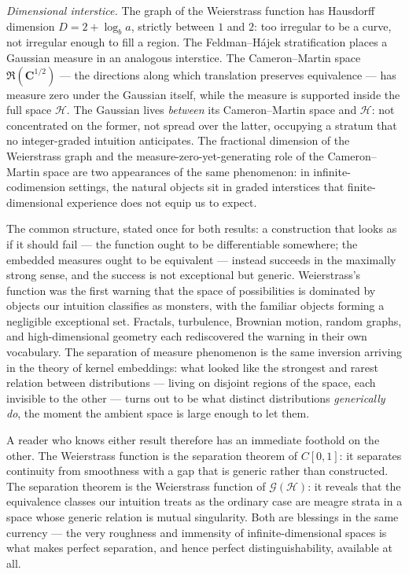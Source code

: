 \documentclass[12pt, oneside]{book}
\theoremstyle{plain}
\theoremstyle{definition}
\newcommand{\calH}{\mathcal{H}}
\newcommand{\ran}{\mathfrak{R}}
\newcommand{\calG}{\mathcal{G}}
\begin{document}
\emph{Dimensional interstice.} The graph of the Weierstrass function
has Hausdorff dimension $D = 2 + \log_b a$, strictly between $1$ and
$2$: too irregular to be a curve, not irregular enough to fill a
region. The Feldman--H\'ajek stratification places a Gaussian measure
in an analogous interstice. The Cameron--Martin space
$\ran(\mathbf{C}^{1/2})$ --- the directions along which translation preserves
equivalence --- has measure zero under the Gaussian itself, while the
measure is supported inside the full space $\calH$. The Gaussian lives
\emph{between} its Cameron--Martin space and $\calH$: not concentrated
on the former, not spread over the latter, occupying a stratum that no
integer-graded intuition anticipates. The fractional dimension of the
Weierstrass graph and the measure-zero-yet-generating role of the
Cameron--Martin space are two appearances of the same phenomenon: in
infinite-codimension settings, the natural objects sit in graded
interstices that finite-dimensional experience does not equip us to
expect.

The common structure, stated once for both results: a construction
that looks as if it should fail --- the function ought to be
differentiable somewhere; the embedded measures ought to be equivalent
--- instead succeeds in the maximally strong sense, and the success is
not exceptional but generic. Weierstrass's function was the first
warning that the space of possibilities is dominated by objects our
intuition classifies as monsters, with the familiar objects forming a
negligible exceptional set. Fractals, turbulence, Brownian motion,
random graphs, and high-dimensional geometry each rediscovered the
warning in their own vocabulary. The separation of measure phenomenon
is the same inversion arriving in the theory of kernel embeddings:
what looked like the strongest and rarest relation between
distributions --- living on disjoint regions of the space, each
invisible to the other --- turns out to be what distinct distributions
\emph{generically do}, the moment the ambient space is large enough to
let them.

A reader who knows either result therefore has an immediate foothold
on the other. The Weierstrass function is the separation theorem of
$C[0,1]$: it separates continuity from smoothness with a gap that is
generic rather than constructed. The separation theorem is the
Weierstrass function of $\calG(\calH)$: it reveals that the
equivalence classes our intuition treats as the ordinary case are
meagre strata in a space whose generic relation is mutual singularity.
Both are blessings in the same currency --- the very roughness and
immensity of infinite-dimensional spaces is what makes perfect
separation, and hence perfect distinguishability, available at all.
\end{document}
